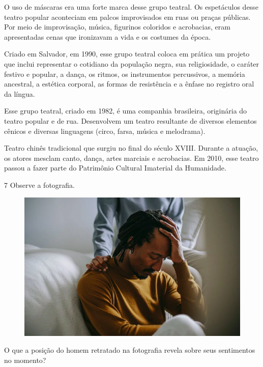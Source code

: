 \begin{boxlist}
 O uso de máscaras era uma forte marca desse grupo teatral. Os
espetáculos desse teatro popular aconteciam em palcos improvisados em
ruas ou praças públicas. Por meio de improvisação, música, figurinos
coloridos e acrobacias, eram apresentadas cenas que ironizavam a vida e
os costumes da época.

 Criado em Salvador, em 1990, esse grupo teatral coloca em prática um
projeto que inclui representar o cotidiano da população negra, sua
religiosidade, o caráter festivo e popular, a dança, os ritmos, os
instrumentos percussivos, a memória ancestral, a estética corporal, as
formas de resistência e a ênfase no registro oral da língua.

 Esse grupo teatral, criado em 1982, é uma companhia brasileira,
originária do teatro popular e de rua. Desenvolvem um teatro resultante
de diversos elementos cênicos e diversas linguagens (circo, farsa, música e
melodrama).

 Teatro chinês tradicional que surgiu no final do século XVIII. Durante a
atuação, os atores mesclam canto, dança, artes marciais e acrobacias. Em
2010, esse teatro passou a fazer parte do Patrimônio Cultural Imaterial
da Humanidade.
\end{boxlist}

\num{7} Observe a fotografia.

\begin{figure}[htpb!]
\includegraphics[width=\textwidth]{./media/image20.png}
\end{figure}

O que a posição do homem retratado na fotografia revela sobre seus sentimentos no momento?

